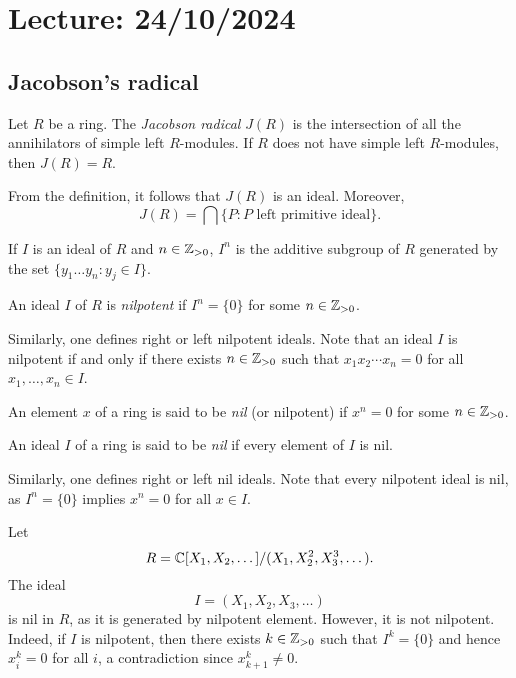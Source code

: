 \section{Lecture: 24/10/2024}
\label{04}


\subsection{Jacobson's radical}

\begin{definition}
\label{def:J}
Let $R$ be a ring. The \emph{Jacobson radical} $J(R)$
is the intersection of all the annihilators of simple left $R$-modules. If $R$ does not
have simple left $R$-modules, then $J(R)=R$. 
\end{definition}

From the definition, it follows
that $J(R)$ is an ideal. Moreover, 
	\[
		J(R)=\bigcap\{P:\text{$P$ left primitive ideal}\}.
	\]

	If $I$ is an ideal of $R$ and $n\in\mathbb{Z}_{>0}$, $I^n$ is the additive subgroup of $R$ 
generated by the set $\{y_1\dots y_n:y_j\in I\}$. 

\begin{definition}
An ideal $I$ of $R$ is \emph{nilpotent} 
if $I^n=\{0\}$ for some $n\in\mathbb{Z}_{>0}$.
\end{definition}

Similarly, one defines right or left nilpotent ideals. 
Note that an ideal $I$ is nilpotent if and only if there exists $n\in\mathbb{Z}_{>0}$ such that 
$x_1x_2\cdots x_n=0$ for all $x_1,\dots,x_n\in I$.  

\begin{definition}
	An element $x$ of a ring is said to be \emph{nil} (or nilpotent) if $x^n=0$ for some $n\in\mathbb{Z}_{>0}$. 
\end{definition}

\begin{definition}
An ideal $I$ of a ring is said to be \emph{nil} if every element of $I$ is nil. 
\end{definition}

Similarly, one defines right or left nil ideals. 
Note that every nilpotent ideal is nil, as $I^n=\{0\}$ implies $x^n=0$ for all 
$x\in I$.

\begin{example}
	Let \[
 R=\mathbb{C}[X_1,X_2,\dots]/(X_1,X_2^2,X_3^3,\dots).
    \]
    The ideal 
	\[ 
    I=(X_1,X_2,X_3,\dots)
    \]
    is nil in $R$, as it is generated by nilpotent element. However, it is not nilpotent. Indeed, if $I$ is nilpotent, then there exists $k\in\mathbb{Z}_{>0}$ such that 
	$I^k=\{0\}$ and hence $x_i^k=0$ for all $i$, a contradiction since 
	$x_{k+1}^k\ne0$. 	
\end{example}

